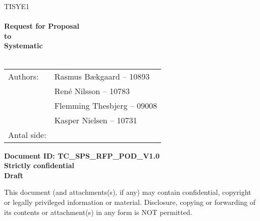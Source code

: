 \documentclass[Main]{subfiles}
\begin{document}
\begin{center}

\textsc{\Large TISYE1}\\[0.5cm]


\HRule \\[0.4cm]

{ \huge \bfseries Request for Proposal}\\[0.4cm]
{ \huge \bfseries to}\\[0.4cm] 
{ \huge \bfseries Systematic}\\[0.4cm]

\HRule \\[1.5cm]

\begin{tabular}{p{}|p{}}
\hline 
Authors: & Rasmus Bækgaard -- 10893\\ &René Nilsson -- 10783\\ &Flemming Thesbjerg -- 09008\\ &Kasper Nielsen -- 10731\\ 
\hline 
Antal side: & \pageref{LastPage} \\
\hline 
\end{tabular} 

\textbf{\Large Document ID: TC\_SPS\_RFP\_POD\_V1.0}\\
\textbf{\Large Strictly confidential}\\
\textbf{\Large Draft}

This document (and attachments(s), if any) may contain confidential, copyright or legally privileged information or material.
Disclosure, copying or forwarding of its contents or attachment(s) in any form is NOT permitted.
\end{center}
\end{document}
